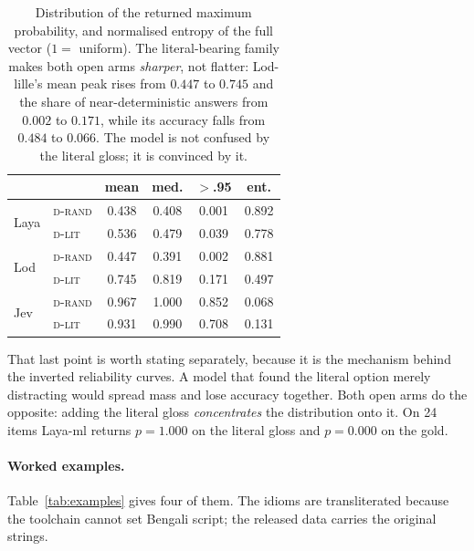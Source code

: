 \documentclass[11pt]{article}
\newcommand{\laya}[1]{\cellcolor{fLaya}#1}
\newcommand{\lod}[1]{\cellcolor{fLod}#1}
\newcommand{\jev}[1]{\cellcolor{fJev}#1}
\newcommand{\Drand}{\textsc{d-rand}}
\newcommand{\Dlit}{\textsc{d-lit}}
\begin{document}
\begin{table}[h]
\centering\small
\setlength{\tabcolsep}{3pt}
\begin{tabular}{llcccc}
\toprule
& & \textbf{mean} & \textbf{med.} & $\mathbf{>}$\textbf{.95} & \textbf{ent.} \\
\midrule
\multirow{2}{*}{\laya{Laya}} & \laya{\Drand} & \laya{0.438} & \laya{0.408} & \laya{0.001} & \laya{0.892} \\
 & \laya{\Dlit} & \laya{0.536} & \laya{0.479} & \laya{0.039} & \laya{0.778} \\
\multirow{2}{*}{\lod{Lod}} & \lod{\Drand} & \lod{0.447} & \lod{0.391} & \lod{0.002} & \lod{0.881} \\
 & \lod{\Dlit} & \lod{0.745} & \lod{0.819} & \lod{0.171} & \lod{0.497} \\
\multirow{2}{*}{\jev{Jev}} & \jev{\Drand} & \jev{0.967} & \jev{1.000} & \jev{0.852} & \jev{0.068} \\
 & \jev{\Dlit} & \jev{0.931} & \jev{0.990} & \jev{0.708} & \jev{0.131} \\
\bottomrule
\end{tabular}
\caption{Distribution of the returned maximum probability, and normalised
entropy of the full vector ($1 =$ uniform). The literal-bearing family makes
both open arms \emph{sharper}, not flatter: Lod-lille's mean peak rises from
$0.447$ to $0.745$ and the share of near-deterministic answers from $0.002$ to
$0.171$, while its accuracy falls from $0.484$ to $0.066$. The model is not
confused by the literal gloss; it is convinced by it.}
\label{tab:dist}
\end{table}

That last point is worth stating separately, because it is the mechanism behind
the inverted reliability curves. A model that found the literal option merely
distracting would spread mass and lose accuracy together. Both open arms do the
opposite: adding the literal gloss \emph{concentrates} the distribution onto it.
On 24 items Laya-ml returns $p = 1.000$ on the literal gloss and $p = 0.000$ on
the gold.

\paragraph{Worked examples.} Table~\ref{tab:examples} gives four of them. The
idioms are transliterated because the toolchain cannot set Bengali script; the
released data carries the original strings.
\end{document}

